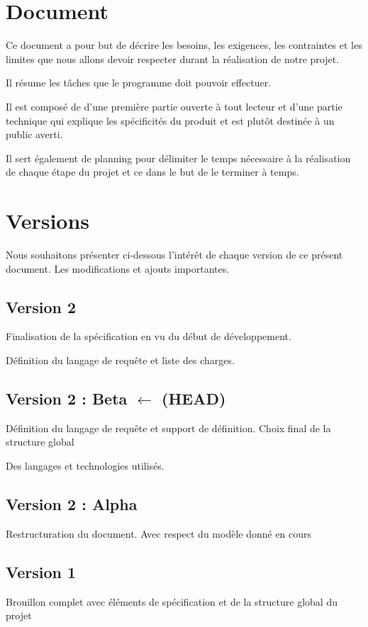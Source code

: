 \documentclass[a4paper,12pt]{report}
\begin{document}
\section*{Document}
Ce document a pour but de décrire les besoins, les exigences, les contraintes et les limites que nous allons devoir respecter durant la réalisation de notre projet.

Il résume les tâches que le programme doit pouvoir effectuer.

Il est composé de d'une première partie ouverte à tout lecteur et d'une partie technique qui explique les spécificités du produit et est plutôt destinée à un public averti.

Il sert également de planning pour délimiter le temps nécessaire à la réalisation de chaque étape du projet et ce dans le but de le terminer à temps.

\section*{Versions}
Nous souhaitons présenter ci-dessous l'intérêt de chaque version de ce présent document. Les modifications et ajouts importantes.

\subsection*{Version 2}
Finalisation de la spécification en vu du début de développement.

Définition du langage de requête et liste des charges.

\subsection*{Version 2 : Beta $\leftarrow$ (HEAD)}
Définition du langage de requête et support de définition. Choix final de la structure global

Des langages et technologies utilisés.

\subsection*{Version 2 : Alpha}
Restructuration du document. Avec respect du modèle donné en cours

\subsection*{Version 1}
Brouillon complet avec éléments de spécification et de la structure global du projet
\end{document}
